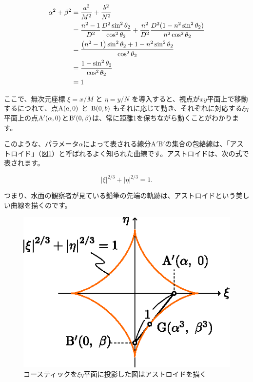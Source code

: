 \documentclass[twocolumn]{article}
\begin{document}
	$$ \begin{aligned}
		\greeka^2 + \greekb^2 &= \dfrac{\romana^2}{M^2}+\dfrac{\romanb^2}{N^2}\\
		&=\dfrac{n^2-1}{D^2}\dfrac{D^2\sin^2\theta_2}{\cos^2\theta_2}%
		+\dfrac{n^2}{D^2}\dfrac{D^2(1-n^2\sin^2\theta_2)}{n^2\cos^2\theta_2}\\
		&=\dfrac{\left(n^2-1\right)\sin^2\theta_2 + 1-n^2\sin^2\theta_2}
		{\cos^2\theta_2}\\
		&=\dfrac{1-\sin^2\theta_2}{\cos^2\theta_2}\\
		&= 1
	\end{aligned}$$
	
	ここで、無次元座標 $\xi=x/M$ と $\eta=y/N$ を導入すると、視点が$xy$平面上で移動するにつれて、点$\mathrm{A}({a}, 0)$ と $\mathrm{B}(0, {b})$ もそれに応じて動き、それぞれに対応する$\xi\eta$平面上の点$\mathrm{A'}({\alpha}, 0)$と$\mathrm{B'}(0, {\beta})$は、常に距離1を保ちながら動くことがわかります。
	
	このような、パラメータ$\alpha$によって表される線分${\mathrm{A'B'}}$の集合の包絡線は、「アストロイド」（図\ref{fig:astroid}）と呼ばれるよく知られた曲線です。アストロイドは、次の式で表されます。
	
	$$ \left| \xi \right|^{2/3} + \left| \eta \right|^{2/3} = 1. $$
	
	つまり、水面の観察者が見ている鉛筆の先端の軌跡は、アストロイドという美しい曲線を描くのです。
	
	\begin{figure}[h]
		\centering
		\includegraphics{figs/g107.eps}	
		\caption{コースティックを$\xi\eta$平面に投影した図はアストロイドを描く}
		\label{fig:astroid}
	\end{figure}
	
\end{document}
